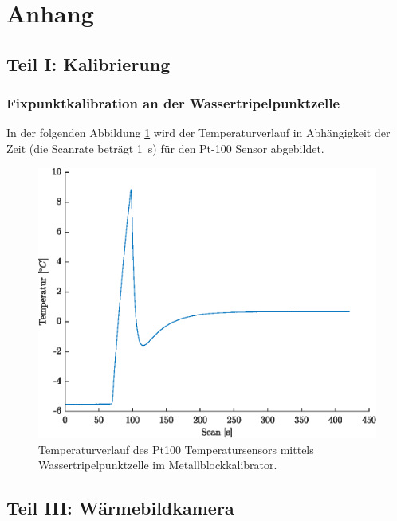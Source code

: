 \section{Anhang}

\subsection{Teil I: Kalibrierung}

\subsubsection{Fixpunktkalibration an der Wassertripelpunktzelle}

In der folgenden Abbildung \ref{fig:Fixpunkt} wird der Temperaturverlauf in Abhängigkeit der Zeit (die Scanrate beträgt \SI{1}{\second}) für den Pt-100 Sensor abgebildet. 

\begin{figure}[H]
	\centering
	\includegraphics[height=0.2\textheight]{../MLAB/Fixpunktkalibration.eps}
	\caption[Temperaturverlauf des Pt100 Temperatursensors mittels Wassertripelpunktzelle]{ Temperaturverlauf des Pt100 Temperatursensors mittels Wassertripelpunktzelle im Metallblockkalibrator.}
	\label{fig:Fixpunkt}
\end{figure}

\subsection{Teil III: Wärmebildkamera}

